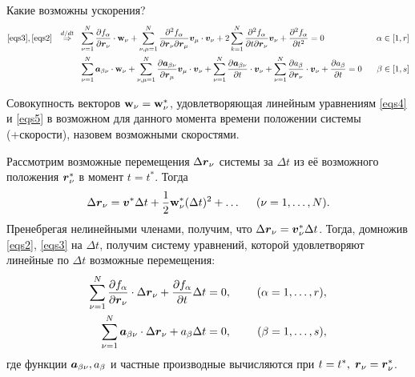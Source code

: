 Какие возможны ускорения?
\begin{align}
\label{eqs4}
    \eqref{eqs3}, \eqref{eqs2}
    \hspace{0.25cm} \overset{d / dt}{\Rightarrow} \hspace{0.25cm} 
    & \sum_{\nu=1}^N \frac{\partial f_\alpha}{\partial \mbox{\boldmath $r$}_\nu} \cdot \mbox{\boldmath $\mathrm{w}$}_\nu +
    \sum_{\nu, \mu=1}^N \frac{\partial^2 f_\alpha}{\partial \mbox{\boldmath $r$}_\nu \partial \mbox{\boldmath $r$}_\mu} \mbox{\boldmath $v$}_\mu \cdot \mbox{\boldmath $v$}_\nu + 2 \sum_{k=1}^N \frac{\partial^2 f_\alpha}{\partial t \partial \mbox{\boldmath $r$}_\nu} \mbox{\boldmath $v$}_\nu + \frac{\partial^2 f_\alpha}{\partial t^2}  = 0 
    \hspace{0.25cm} &\alpha \in [1, r]\\
\label{eqs5}
    & \sum_{\nu=1}^N \mbox{\boldmath $a$}_{\beta\nu} \cdot \mbox{\boldmath $\mathrm{w}$}_\nu + \sum_{\nu, \mu =1}^N \frac{\partial \mbox{\boldmath $a$}_{\beta\nu}}{\partial \mbox{\boldmath $r$}_\mu} \mbox{\boldmath $v$}_\mu \cdot \mbox{\boldmath $v$}_\nu + \sum_{\nu=1}^N \frac{\partial \mbox{\boldmath $a$}_{\beta\nu}}{\partial t} \cdot \mbox{\boldmath $v$}_\nu + \sum_{\nu=1}^N \frac{\partial a_\beta}{\partial \mbox{\boldmath $r$}_\nu} \cdot \mbox{\boldmath $v$}_\nu + \frac{\partial  a_\beta}{\partial t} = 0
     \hspace{0.25cm} &\beta \in [1, s]
\end{align}

Совокупность векторов $\mbox{\boldmath $\mathrm{w}$}_\nu =\mbox{\boldmath $\mathrm{w}$}_\nu^*$, удовлетворяющая линейным
уравнениям \eqref{eqs4} и \eqref{eqs5} в возможном для данного момента времени положении
системы (+скорости), назовем возможными скоростями. 

Рассмотрим возможные перемещения $\Delta \mbox{\boldmath $r$}_\nu$ системы за $\Delta t$ из её возможного положения $\mbox{\boldmath $r$}_\nu^*$ в момент $t=t^*$. Тогда 
\begin{equation}
    \Delta \mbox{\boldmath $r$}_\nu = \mbox{\boldmath $v$}^* \Delta t + \frac{1}{2} \mbox{\boldmath $\mathrm{w}$}_\nu^* (\Delta t)^2 + \ldots
    \hspace{0.5cm} (\nu = 1, \ldots, N).
\end{equation}
Пренебрегая нелинейными членами, получим, что $\Delta \mbox{\boldmath $r$}_\nu = \mbox{\boldmath $v$}_\nu^* \Delta t$. Тогда, домножив \eqref{eqs2}, \eqref{eqs3} на $\Delta t$, получим систему уравнений, которой удовлетворяют линейные по $\Delta t$ возможные перемещения:
\begin{align}
\label{eqs7}
    \sum_{\nu=1}^N \frac{\partial f_\alpha}{\partial \mbox{\boldmath $r$}_\nu} \cdot \Delta \mbox{\boldmath $r$}_\nu + \frac{\partial f_\alpha}{\partial t} \Delta t &= 0,
    \hspace{0.5cm} &(\alpha = 1, \ldots, r), \\
\label{eqs8}
    \sum_{\nu=1}^N \mbox{\boldmath $a$}_{\beta\nu} \cdot \Delta \mbox{\boldmath $r$}_\nu + a_\beta \Delta t &= 0,
    \hspace{0.5cm} &(\beta = 1, \ldots, s),
\end{align}
где функции $\mbox{\boldmath $a$}_{\beta\nu}, a_\beta$ и частные производные вычисляются при $t=t^*, \; \mbox{\boldmath $r$}_\nu = \mbox{\boldmath $r$}_\nu^*$.


